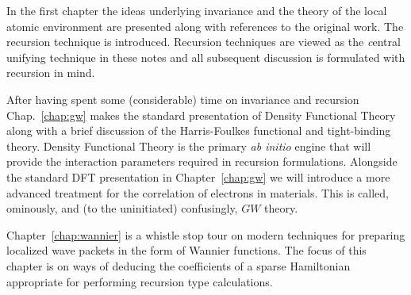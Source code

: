 In the first chapter the ideas underlying invariance and the 
theory of the local atomic environment are presented along with references
to the original work. The recursion technique is introduced. 
Recursion techniques are viewed as the {\emph central unifying technique} in these
notes and all subsequent discussion is formulated with recursion in mind.

After having spent some (considerable) time on invariance and recursion
Chap.~\ref{chap:gw} makes the standard presentation of Density Functional Theory along 
with a brief discussion of the Harris-Foulkes functional and tight-binding theory. 
Density Functional Theory is the primary {\it ab initio} engine that will 
provide the interaction parameters required in recursion formulations.
Alongside the standard DFT presentation in Chapter~\ref{chap:gw} we will
introduce a more advanced treatment for the correlation of electrons in materials.
This is called, ominously, and (to the uninitiated) confusingly, $GW$ theory.

Chapter~\ref{chap:wannier} is a whistle stop tour 
on modern techniques for preparing localized wave packets in the 
form of Wannier functions. The focus of this chapter is on 
ways of deducing the coefficients of a sparse Hamiltonian
appropriate for performing recursion type calculations.




